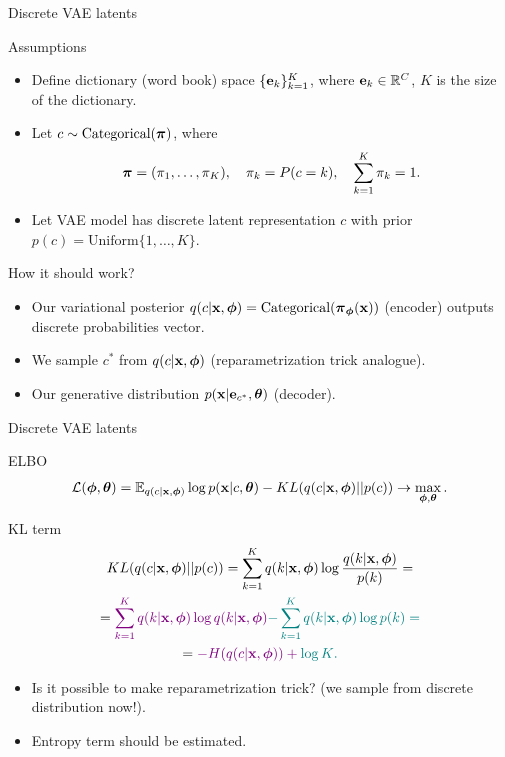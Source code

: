 \begin{frame}{Discrete VAE latents}
	\begin{block}{Assumptions}
		\begin{itemize}
			\item Define dictionary (word book) space $\{\mathbf{e}_k\}_{k=1}^K$, where $\mathbf{e}_k \in \mathbb{R}^C$, $K$ is the size of the dictionary.
			\item Let $c \sim \text{Categorical}(\boldsymbol{\pi})$, where 
			\vspace{-0.6cm}
			\[
			\boldsymbol{\pi} = (\pi_1, \dots, \pi_K), \quad \pi_k = P(c = k), \quad \sum_{k=1}^K \pi_k = 1.
			\]
			\vspace{-0.6cm}
			\item Let VAE model has discrete latent representation $c$ with prior $p(c) = \text{Uniform}\{1, \dots, K\}$.
		\end{itemize}
	\end{block}
	\vspace{-0.3cm}
	\begin{block}{How it should work?}
		\begin{itemize}
			\item Our variational posterior $q(c | \mathbf{x}, \boldsymbol{\phi}) = \text{Categorical}(\boldsymbol{\pi}_{\boldsymbol{\phi}}(\mathbf{x}))$ (encoder) outputs discrete probabilities vector.
			\item We sample $c^*$ from $q(c | \mathbf{x}, \boldsymbol{\phi})$ (reparametrization trick analogue).
			\item Our generative distribution $p(\mathbf{x} | \mathbf{e}_{c^*}, \boldsymbol{\theta})$ (decoder).
		\end{itemize}
	\end{block}
\end{frame}
\begin{frame}{Discrete VAE latents}
	\begin{block}{ELBO}
		\vspace{-0.5cm}
		\[
		\mathcal{L} (\boldsymbol{\phi}, \boldsymbol{\theta})  = \mathbb{E}_{q(c | \mathbf{x}, \boldsymbol{\phi})} \log p(\mathbf{x} | c, \boldsymbol{\theta}) - KL(q(c| \mathbf{x}, \boldsymbol{\phi}) || p(c)) \rightarrow \max_{\boldsymbol{\phi}, \boldsymbol{\theta}}.
		\]
		\vspace{-0.5cm}
	\end{block}
	\begin{block}{KL term}
		\vspace{-0.8cm}
		\begin{multline*}
			KL(q(c| \mathbf{x}, \boldsymbol{\phi}) || p(c)) = \sum_{k=1}^K q(k | \mathbf{x}, \boldsymbol{\phi}) \log \frac{q(k | \mathbf{x}, \boldsymbol{\phi})}{p(k)} = 
			\\ = \color{violet}{\sum_{k=1}^K q(k | \mathbf{x}, \boldsymbol{\phi}) \log q(k | \mathbf{x}, \boldsymbol{\phi})}  \color{teal}{- \sum_{k=1}^K q(k | \mathbf{x}, \boldsymbol{\phi}) \log p(k)}  = \\ = \color{violet}{- H(q(c | \mathbf{x}, \boldsymbol{\phi}))} + \color{teal}{\log K}. 
		\end{multline*}
		\vspace{-0.6cm}
	\end{block}
	\begin{itemize}
		\item Is it possible to make reparametrization trick? (we sample from discrete distribution now!).
		\item Entropy term should be estimated.
	\end{itemize}
\end{frame}
